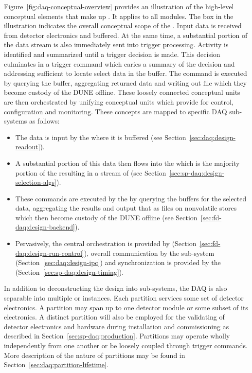 Figure~\ref{fig:daq-conceptual-overview} provides an illustration of the high-level conceptual elements that make up   . 
It applies to all  modules. 
The box in the illustration indicates the overall conceptual scope of the .
Input data is received from detector electronics and buffered. 
At the same time, a substantial portion of the data stream is also immediately sent into trigger processing. 
Activity is identified and summarized until a trigger decision is made. 
This decision culminates in a trigger command which caries a summary of the decision and addressing sufficient to locate select data in the buffer.
The command is executed by querying the buffer, aggregating returned data and writing out file which they become custody of the DUNE offline.
These loosely connected conceptual units are then orchestrated by unifying conceptual units which provide for control, configuration and monitoring.
These concepts are mapped to specific DAQ sub-systems as follows:

\begin{itemize}
\item The data is input by the  where it is buffered (see Section~\ref{sec:daq:design-readout}).

\item A substantial portion of this data then flows into the  which is the majority portion of the  resulting in a stream of  (see Section~\ref{sec:sp-daq:design-selection-algs}).

\item These commands are executed by the  by querying the buffers for the selected data, aggregating the results and output that as files on nonvolatile stores which then become custody of the DUNE offline (see Section~\ref{sec:fd-daq:design-backend}).

\item Pervasively, the central orchestration is provided by  (Section~\ref{sec:fd-daq:design-run-control}), overall communication by the  sub-system (Section~\ref{sec:daq:design-ipc}) and synchronization is provided by the  (Section~\ref{sec:sp-daq:design-timing}).
\end{itemize}


In addition to deconstructing the design into sub-systems, the DAQ is also separable into multiple  or instances. 
Each partition services some set of detector electronics. 
A partition may span up to one detector module or some subset of its electronics. 
A distinct partition will also be employed for the validating of detector electronics and hardware during installation and commissioning as described in Section~\ref{sec:sp-daq:production}.
Partitions may operate wholly independently from one another or be loosely coupled through trigger commands.  
More description of the nature of partitions may be found in Section~\ref{sec:daq:partition-lifetime}.



